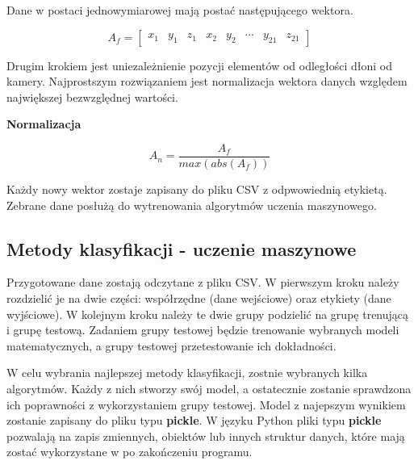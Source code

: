 Dane w postaci jednowymiarowej mają postać następującego wektora. 

\begin{equation*}
    A_f=
    \begin{bmatrix}
        x_1 & y_1 & z_1 & x_2 & y_2 & \cdots & y_{21} & z_{21}
    \end{bmatrix}
\end{equation*}


\quad Drugim krokiem jest uniezależnienie pozycji elementów od odległości dłoni od kamery. Najprostszym rozwiązaniem jest normalizacja wektora danych względem największej bezwzględnej wartości. 

\quad \textbf{Normalizacja}



\begin{equation*}
    A_n=\dfrac{A_f}{max(abs(A_f))}
\end{equation*}

\quad Każdy nowy wektor zostaje zapisany do pliku CSV z odpwowiednią etykietą. Zebrane dane posłużą do wytrenowania algorytmów uczenia maszynowego. 



\subsection{Metody klasyfikacji - uczenie maszynowe}

\quad Przygotowane dane zostają odczytane z pliku CSV. W pierwszym kroku należy rozdzielić je na dwie części: współrzędne (dane wejściowe) oraz etykiety (dane wyjściowe). W kolejnym kroku należy te dwie grupy podzielić na grupę trenującą i grupę testową. Zadaniem grupy testowej będzie trenowanie wybranych modeli matematycznych, a grupy testowej przetestowanie ich dokładności. 

\quad W celu wybrania najlepszej metody klasyfikacji, zostnie wybranych kilka algorytmów. Każdy z nich stworzy swój model, a ostatecznie zostanie sprawdzona ich poprawności z wykorzystaniem grupy testowej. Model z najepszym wynikiem zostanie zapisany do pliku typu \textbf{pickle}. W języku Python pliki typu \textbf{pickle} pozwalają na zapis zmiennych, obiektów lub innych struktur danych, które mają zostać wykorzystane w po zakończeniu programu. 

